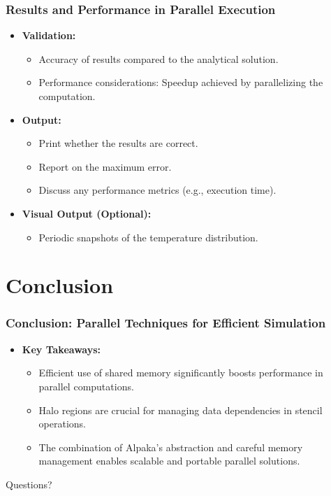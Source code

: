 \documentclass[9pt]{beamer}
\begin{document}
\begin{frame}
\frametitle{Results and Performance in Parallel Execution}
\begin{itemize}
    \item \textbf{Validation:} 
    \begin{itemize}
        \item Accuracy of results compared to the analytical solution.
        \item Performance considerations: Speedup achieved by parallelizing the computation.
    \end{itemize}
    \item \textbf{Output:}
    \begin{itemize}
        \item Print whether the results are correct.
        \item Report on the maximum error.
        \item Discuss any performance metrics (e.g., execution time).
    \end{itemize}
    \item \textbf{Visual Output (Optional):}
    \begin{itemize}
        \item Periodic snapshots of the temperature distribution.
    \end{itemize}
\end{itemize}
\end{frame}

\section{Conclusion}

\begin{frame}
\frametitle{Conclusion: Parallel Techniques for Efficient Simulation}
\begin{itemize}
    \item \textbf{Key Takeaways:}
    \begin{itemize}
        \item Efficient use of shared memory significantly boosts performance in parallel computations.
        \item Halo regions are crucial for managing data dependencies in stencil operations.
        \item The combination of Alpaka’s abstraction and careful memory management enables scalable and portable parallel solutions.
    \end{itemize}
\end{itemize}
\end{frame}


\begin{frame}
\Huge{\centerline{Questions?}}
\end{frame}

\end{document}
